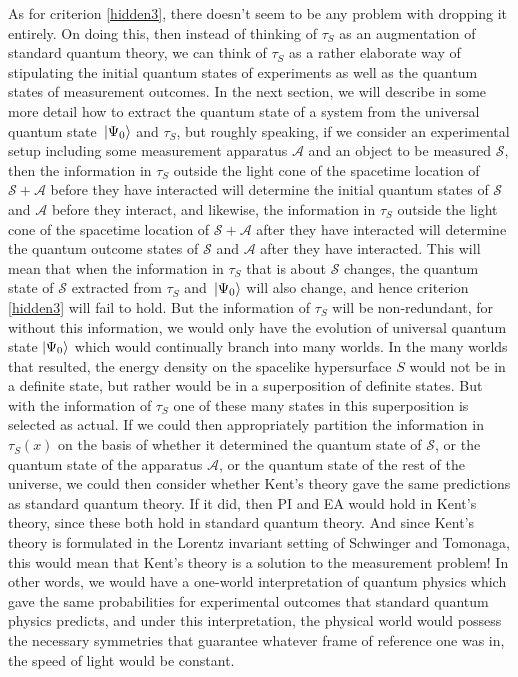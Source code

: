 As for criterion \ref{hidden3}, there doesn't seem to be any problem with dropping it entirely. On doing this, then instead of thinking of $\tau_S$ as an augmentation of standard quantum theory, we can think of $\tau_S$ as a rather elaborate way of stipulating the initial quantum states of experiments as well as the quantum states of measurement outcomes. In the next section, we will describe in some more detail how to extract the quantum state of a system from the universal quantum state $\ket*{\Psi_0}$ and $\tau_S$, but roughly speaking, if we consider an experimental setup including some measurement apparatus $\mathcal{A}$ and an object to be measured $\mathcal{S}$, then the information in  $\tau_S$ outside the light cone of the spacetime location of $\mathcal{S}+\mathcal{A}$ before they have interacted will determine the initial quantum states of $\mathcal{S}$ and $\mathcal{A}$ before they interact, and likewise, the information in  $\tau_S$ outside the light cone of the spacetime location of $\mathcal{S}+\mathcal{A}$ after they have interacted will determine the quantum outcome states of $\mathcal{S}$ and $\mathcal{A}$ after they have interacted. This will mean that when the information in $\tau_S$ that is about $\mathcal{S}$ changes, the quantum state of $\mathcal{S}$ extracted from $\tau_S$ and   $\ket*{\Psi_0}$ will also change, and hence criterion \ref{hidden3} will fail to hold. But the information of $\tau_S$ will be non-redundant, for without this information, we would only have the evolution of universal quantum state $\ket{\Psi_0}$ which would continually branch into many worlds. In the many worlds that resulted, the energy density on the spacelike hypersurface $S$ would not be in a definite state, but rather would be in a superposition of definite states. But with the information of $\tau_S$ one of these many states in this superposition is selected as actual. If we could then appropriately partition the information in $\tau_S(x)$ on the basis of whether it determined the quantum state of $\mathcal{S}$, or the quantum state of the apparatus $\mathcal{A}$, or the quantum state of the rest of the universe, we could then consider whether Kent's theory gave the same predictions as standard quantum theory. If it did, then PI and EA would hold in Kent's theory, since these both hold in standard quantum theory. And since Kent's theory is formulated in the Lorentz invariant setting of Schwinger and Tomonaga, this would mean that Kent's theory is a solution to the measurement problem! In other words, we would have a one-world interpretation of quantum physics which gave the same probabilities for experimental outcomes that standard quantum physics predicts, and under this interpretation, the physical world would possess the necessary symmetries that guarantee whatever frame of reference one was in, the speed of light would be constant.  

